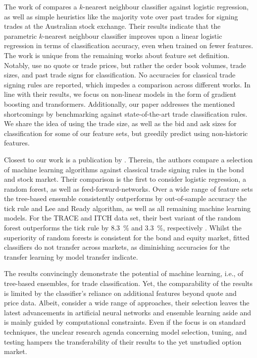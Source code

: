 The work of \textcite[483]{blazejewskiLocalNonParametricModel2005} compares a $k$-nearest neighbour classifier against logistic regression, as well as simple heuristics like the majority vote over past trades for signing trades at the Australian stock exchange. Their results indicate that the parametric $k$-nearest neighbour classifier improves upon a linear logistic regression in terms of classification accuracy, even when trained on fewer features. The work is unique from the remaining works about feature set definition. Notably, \textcite[3]{blazejewskiLocalNonParametricModel2005} use no quote or trade prices, but rather the order book volumes, trade sizes, and past trade signs for classification. No accuracies for classical trade signing rules are reported, which impedes a comparison across different works. In line with their results, we focus on non-linear models in the form of gradient boosting and transformers. Additionally, our paper addresses the mentioned shortcomings by benchmarking against state-of-the-art trade classification rules. We share the idea of using the trade size, as well as the bid and ask sizes for classification for some of our feature sets, but greedily predict using non-historic features.

Closest to our work is a publication by \textcite[1--58]{ronenMachineLearningTrade2022}. Therein, the authors compare a selection of machine learning algorithms against classical trade signing rules in the bond and stock market. Their comparison is the first to consider logistic regression, a random forest, as well as \glspl{feed-forward-network}. Over a wide range of feature sets the tree-based ensemble consistently outperforms by out-of-sample accuracy the tick rule and Lee and Ready algorithm, as well as all remaining machine learning models. For the \gls{TRACE} and ITCH data set, their best variant of the random forest outperforms the tick rule by \SI{8.3}{\percent} and \SI{3.3}{\percent}, respectively \autocite[57]{ronenMachineLearningTrade2022}. Whilst the superiority of random forests is consistent for the bond and equity market, fitted classifiers do not transfer across markets, as diminishing accuracies for the transfer learning by model transfer indicate.

The results convincingly demonstrate the potential of machine learning, i.e., of tree-based ensembles, for trade classification. Yet, the comparability of the results is limited by the classifier's reliance on additional features beyond quote and price data. Albeit, \textcite[4]{ronenMachineLearningTrade2022} consider a wide range of approaches, their selection leaves the latest advancements in artificial neural networks and ensemble learning aside and is mainly guided by computational constraints. Even if the focus is on standard techniques, the unclear research agenda concerning model selection, tuning, and testing hampers the transferability of their results to the yet unstudied option market.

